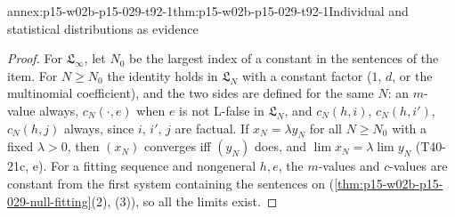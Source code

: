 \begin{annexitem}{annex:p15-w02b-p15-029-t92-1}{thm:p15-w02b-p15-029-t92-1}{Individual and statistical distributions as evidence}
\begin{proof}
For \(\mathfrak L_\infty\), let \(N_0\) be the largest index of a
constant in the sentences of the item. For \(N\geq N_0\) the identity
holds in \(\mathfrak L_N\) with a constant factor (\(1\), \(d\), or the
multinomial coefficient), and the two sides are defined for the same
\(N\): an \(m\)-value always, \(c_N(\cdot,e)\) when \(e\) is not
L-false in \(\mathfrak L_N\), and \(c_N(h,i)\), \(c_N(h,i')\),
\(c_N(h,j)\) always, since \(i\), \(i'\), \(j\) are factual. If
\(x_N=\lambda y_N\) for all \(N\geq N_0\) with a fixed \(\lambda>0\),
then \((x_N)\) converges iff \((y_N)\) does, and
\(\lim x_N=\lambda\lim y_N\) (T40-21c, e). For a fitting sequence and
nongeneral \(h,e\), the \(m\)-values and \(c\)-values are constant from
the first system containing the sentences on
(\cref{thm:p15-w02b-p15-029-null-fitting}(2), (3)), so all the limits
exist.
\end{proof}
\end{annexitem}

